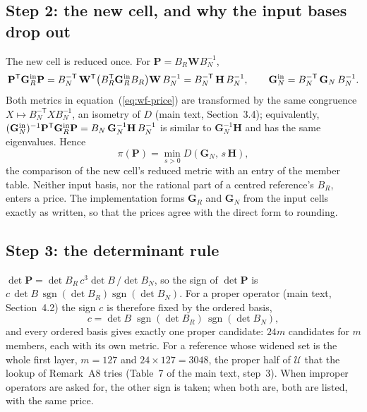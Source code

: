 \documentclass[preprint,pdf]{iucr}          %
\newcommand{\Gmet}{\mathbf{G}}
\newcommand{\Pop}{\mathbf{P}}
\newcommand{\Wop}{\mathbf{W}}
\newcommand{\dist}{D}
\begin{document}
\subsection{Step 2: the new cell, and why the input bases drop out}

The new cell is reduced once. For $\Pop=B_R\Wop B_N^{-1}$,
\begin{equation}
\Pop^{\mathsf T}\Gmet_R^{\rm in}\Pop=B_N^{-\mathsf T}\,\Wop^{\mathsf T}\bigl(B_R^{\mathsf T}\Gmet_R^{\rm in}B_R\bigr)\Wop\,B_N^{-1}=B_N^{-\mathsf T}\,\mathbf H\,B_N^{-1},\qquad \Gmet_N^{\rm in}=B_N^{-\mathsf T}\,\Gmet_N\,B_N^{-1}.
\end{equation}
Both metrics in equation~(\ref{eq:wf-price}) are transformed by the same congruence $X\mapsto B_N^{-\mathsf T}XB_N^{-1}$, an isometry of $\dist$ (main text, Section~3.4); equivalently, $(\Gmet_N^{\rm in})^{-1}\Pop^{\mathsf T}\Gmet_R^{\rm in}\Pop=B_N\,\Gmet_N^{-1}\mathbf H\,B_N^{-1}$ is similar to $\Gmet_N^{-1}\mathbf H$ and has the same eigenvalues. Hence
\begin{equation}
\pi(\Pop)=\min_{s>0}\dist(\Gmet_N,\,s\,\mathbf H),
\label{eq:wf-reduced}
\end{equation}
the comparison of the new cell's reduced metric with an entry of the member table. Neither input basis, nor the rational part of a centred reference's $B_R$, enters a price. The implementation forms $\Gmet_R$ and $\Gmet_N$ from the input cells exactly as written, so that the prices agree with the direct form to rounding.

\subsection{Step 3: the determinant rule}

$\det\Pop=\det B_R\,c^3\det B\,/\det B_N$, so the sign of $\det\Pop$ is $c\,\det B\,\operatorname{sgn}(\det B_R)\operatorname{sgn}(\det B_N)$. For a proper operator (main text, Section~4.2) the sign $c$ is therefore fixed by the ordered basis,
\begin{equation}
c=\det B\;\operatorname{sgn}(\det B_R)\,\operatorname{sgn}(\det B_N),
\end{equation}
and every ordered basis gives exactly one proper candidate: $24m$ candidates for $m$ members, each with its own metric. For a reference whose widened set is the whole first layer, $m=127$ and $24\times127=3048$, the proper half of $\mathcal U$ that the lookup of Remark~A8 tries (Table~7 of the main text, step~3). When improper operators are asked for, the other sign is taken; when both are, both are listed, with the same price.
\end{document}
